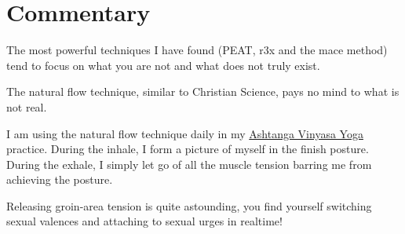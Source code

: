 \documentclass[12pt]{article}
\begin{document}
\section{Commentary}

The most powerful techniques I have found (PEAT, r3x and the mace
method) tend to focus on what you are not and what does not truly
exist. 

The natural flow technique, similar to Christian Science, pays no mind
to what is not real.

I am using the natural flow technique daily in my 
\href{http://Ashtanga.Info}{Ashtanga Vinyasa Yoga} practice. During the
inhale, I form a picture of myself in the finish posture. During the
exhale, I simply let go of all the muscle tension barring me from
achieving the posture.

Releasing groin-area tension is quite astounding, you find yourself
switching sexual valences and attaching to sexual urges in realtime!
\end{document}
